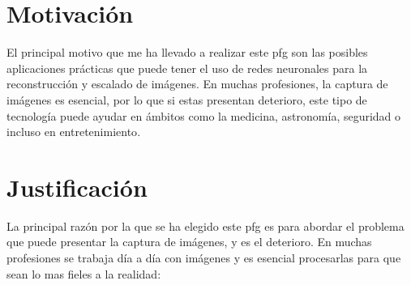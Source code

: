 
\section{Motivación}


\quad El principal motivo que me ha llevado a realizar este \gls{pfg} son las posibles aplicaciones prácticas que puede tener el uso de redes neuronales para la reconstrucción y escalado de imágenes. En muchas profesiones, la captura de imágenes es esencial, por lo que si estas presentan deterioro, este tipo de tecnología puede ayudar en ámbitos como la medicina, astronomía, seguridad o incluso en entretenimiento\cite{medicalrestore2,medicalrestore1,astronomyrestore1,securityrestore1,nvidia_dlss}.



\section{Justificación}

\quad La principal razón por la que se ha elegido este \gls{pfg} es para abordar el problema que puede presentar la captura de imágenes, y es el deterioro. En muchas profesiones se trabaja día a día con imágenes y es esencial procesarlas para que sean lo mas fieles a la realidad:

